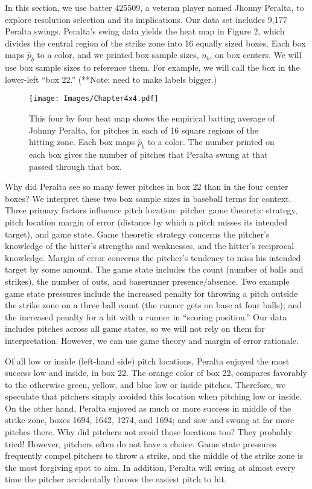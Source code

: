 In this section, we use batter 425509, a veteran player named Jhonny Peralta, to explore resolution selection and its implications. Our data set includes 9,177 Peralta swings. Peralta's swing data yields the heat map in Figure 2, which divides the central region of the strike zone into 16 equally sized boxes. Each box maps $\hat{p}_{b}$ to a color, and we printed box sample sizes, $n_{b}$, on box centers. We will use box sample sizes to reference them. For example, we will call the box in the lower-left ``box 22.'' (**Note: need to make labels bigger.)
        \begin{figure}[H]
      	\centering
      	\texttt{[image: Images/Chapter4x4.pdf]} 
      	\caption{This four by four heat map shows the empirical batting average of Johnny Peralta, for pitches in each of 16 square regions of the hitting zone. Each box maps $\hat{p}_{b}$ to a color. The number printed on each box gives the number of pitches that Peralta swung at that passed through that box.}
      	\end{figure} 
Why did Peralta see so many fewer pitches in box 22 than in the four center boxes?  We interpret these two box sample sizes in baseball terms for context. Three primary factors influence pitch location: pitcher game theoretic strategy, pitch location margin of error (distance by which a pitch misses its intended target), and game state. Game theoretic strategy concerns the pitcher's knowledge of the hitter's strengths and weaknesses, and the hitter's reciprocal knowledge. Margin of error concerns the pitcher's tendency to miss his intended target by some amount. The game state includes the count (number of balls and strikes), the number of outs, and baserunner presence/absence. Two example game state pressures include the increased penalty for throwing a pitch outside the strike zone on a three ball count (the runner gets on base at four balls); and the increased penalty for a hit with a runner in ``scoring position.'' Our data includes pitches across all game states, so we will not rely on them for interpretation. However, we can use game theory and margin of error rationale. 

Of all low or inside (left-hand side) pitch locations, Peralta enjoyed the most success low and inside, in box 22. The orange color of box 22, compares favorably to the otherwise green, yellow, and blue low or inside pitches. Therefore, we speculate that pitchers simply avoided this location when pitching low or inside. On the other hand, Peralta enjoyed as much or more success in middle of the strike zone, boxes 1694, 1642, 1274, and 1694; and saw and swung at far more pitches there. Why did pitchers not avoid those locations too? They probably tried! However, pitchers often do not have a choice. Game state pressures frequently compel pitchers to throw a strike, and the middle of the strike zone is the most forgiving spot to aim. In addition, Peralta will swing at almost every time the pitcher accidentally throws the easiest pitch to hit.


